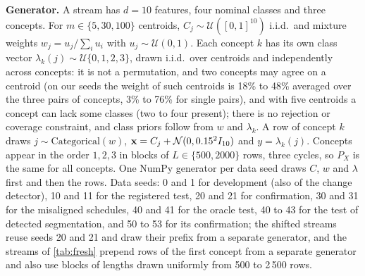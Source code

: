 \documentclass[11pt]{article}
\theoremstyle{plain}
\theoremstyle{definition}
\theoremstyle{remark}
\begin{document}
\textbf{Generator.} A stream has $d=10$ features, four nominal classes and three concepts. For $m\in\{5,30,100\}$
centroids, $C_j\sim\mathcal U([0,1]^{10})$ i.i.d.\ and mixture weights $w_j=u_j/\sum_i u_i$ with $u_j\sim\mathcal U(0,1)$.
Each concept $k$ has its own class vector $\lambda_k(j)\sim\mathcal U\{0,1,2,3\}$, drawn i.i.d.\ over centroids and
independently across concepts: it is not a permutation, and two concepts may agree on a centroid (on our seeds the
weight of such centroids is 18\% to 48\% averaged over the three pairs of concepts, 3\% to 76\% for single pairs), and with five centroids a concept can lack some classes (two to four
present); there is no rejection or coverage constraint, and class priors follow from $w$ and $\lambda_k$. A row of
concept $k$ draws $j\sim\mathrm{Categorical}(w)$, $\mathbf{x}=C_j+\mathcal N(0,0.15^2 I_{10})$ and $y=\lambda_k(j)$. Concepts
appear in the order $1,2,3$ in blocks of $L\in\{500,2000\}$ rows, three cycles, so $P_X$ is the same for all
concepts. One NumPy generator per data seed draws $C$, $w$ and $\lambda$ first and then the rows. Data seeds: 0 and 1
for development (also of the change detector), 10 and 11 for the registered test, 20 and 21 for confirmation, 30 and
31 for the misaligned schedules, 40 and 41 for the oracle test, 40 to 43 for the test of detected segmentation, and 50 to 53 for its confirmation;
the shifted streams reuse seeds 20 and 21 and draw their prefix from a separate generator, and the streams of
\cref{tab:fresh} prepend rows of the first concept from a separate generator and also use blocks of lengths drawn
uniformly from 500 to 2\,500 rows.

\begin{table}[t]
  \centering
  \caption{Controlled grid: parameters.}
  \label{tab:gridparams}
  \small
\end{table}
\end{document}
